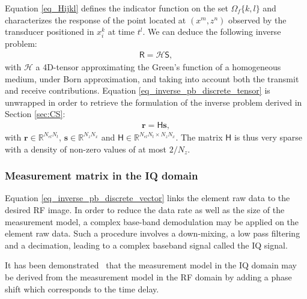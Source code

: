 \documentclass[conference]{IEEEtran}
\begin{document}
Equation \eqref{eq_Hijkl} defines the indicator function on the set $\Omega_f \{k,l \}$ and characterizes the response of the point located at $\left(x^m, z^n\right)$ observed by the transducer positioned in $x_i^k$ at time $t^l$. We can deduce the following inverse problem:
\begin{align}
\label{eq_inverse_pb_discrete_tensor}
\mathsf{R} = \mathcal{H} \mathsf{S}, 
\end{align}
with $\mathcal{H} $ a 4D-tensor approximating the Green's function of a homogeneous medium, under Born approximation, and taking into account both the transmit and receive contributions.
Equation \eqref{eq_inverse_pb_discrete_tensor} is unwrapped in order to retrieve the formulation of the inverse problem derived in Section \ref{sec:CS}:
\begin{align}
\label{eq_inverse_pb_discrete_vector}
\bm{r} = \mathsf{H} \bm{s},
\end{align}
with $\bm{r} \in \mathbb{R}^{N_{el}N_t}$, $\bm{s} \in \mathbb{R}^{N_{z} N_x}$ and $\mathsf{H} \in \mathbb{R}^{N_{el}N_t \times N_{z} N_x}$. The matrix $\mathsf{H}$ is thus very sparse with a density of non-zero values of at most $2 / N_z$.
\subsubsection{Measurement matrix in the IQ domain}
\label{subsubsec_meas_model_IQ}
Equation \eqref{eq_inverse_pb_discrete_vector} links the element raw data to the desired RF image. In order to reduce the data rate as well as the size of the measurement model, a complex base-band demodulation may be applied on the element raw data. Such a procedure involves a down-mixing, a low pass filtering and a decimation, leading to a complex baseband signal called the IQ signal.
\par It has been demonstrated~\cite{Horvat1992} that the measurement model in the IQ domain may be derived from the measurement model in the RF domain by adding a phase shift which corresponds to the time delay.
\end{document}
